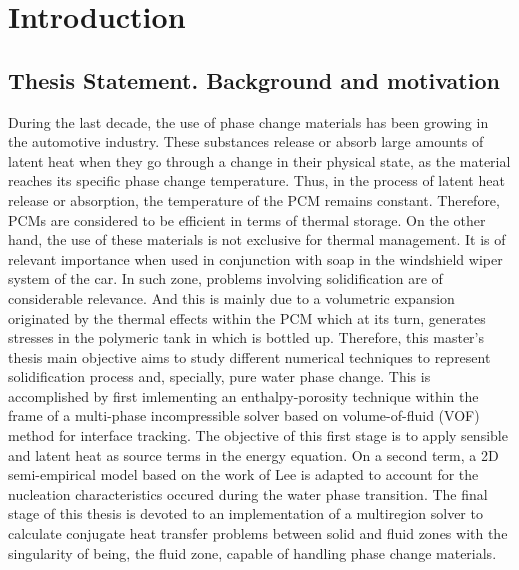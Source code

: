 
\chapter{Introduction} %

\label{Chapter1} %


\newcommand{\keyword}[1]{\textbf{#1}}
\newcommand{\tabhead}[1]{\textbf{#1}}
\newcommand{\code}[1]{\texttt{#1}}
\newcommand{\file}[1]{\texttt{\bfseries#1}}
\newcommand{\option}[1]{\texttt{\itshape#1}}
\setcounter{secnumdepth}{4}

\section{Thesis Statement. Background and motivation}

During the last decade, the use of phase change materials has been growing in the automotive industry. \newline
These substances release or absorb large amounts of latent heat when they go through a change in their physical state, as the material reaches its specific phase change temperature. Thus, in the process of latent heat release or absorption, the temperature of the PCM remains constant. Therefore, PCMs are considered to be efficient in terms of thermal storage. \newline
\indent On the other hand, the use of these materials is not exclusive for thermal management. It is of relevant importance when used in conjunction with soap in the windshield wiper system of the car. In such zone, problems involving solidification are of considerable relevance. And this is mainly due to a volumetric expansion originated by the thermal effects within the PCM which at its turn, generates stresses in the polymeric tank in which is bottled up.
\newline
\indent Therefore, this master's thesis main objective aims to study different numerical techniques to represent solidification process and, specially, pure water phase change. This is accomplished by first imlementing an enthalpy-porosity technique within the frame of a multi-phase incompressible solver based on volume-of-fluid (VOF) method for interface tracking. The objective of this first stage is to apply sensible and latent heat as source terms in the energy equation. On a second term, a 2D semi-empirical model based on the work of Lee is adapted to account for the nucleation characteristics occured during the water phase transition. 
\newline
\indent The final stage of this thesis is devoted to an implementation of a multiregion solver to calculate conjugate heat transfer problems between solid and fluid zones with the singularity of being, the fluid zone, capable of handling phase change materials. 

